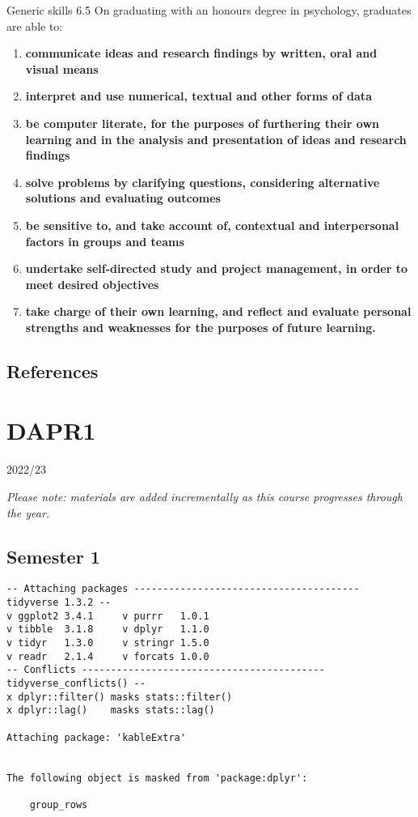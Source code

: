 \documentclass[
  11pt,
  letterpaper,
  oneside,
  open=any]{scrbook}
\begin{document}
Generic skills 6.5 On graduating with an honours degree in psychology,
graduates are able to:

\begin{enumerate}
\def\labelenumi{\arabic{enumi}.}
\item
  \textbf{communicate ideas and research findings by written, oral and
  visual means}
\item
  \textbf{interpret and use numerical, textual and other forms of data}
\item
  \textbf{be computer literate, for the purposes of furthering their own
  learning and in the analysis and presentation of ideas and research
  findings}
\item
  \textbf{solve problems by clarifying questions, considering
  alternative solutions and evaluating outcomes}
\item
  \textbf{be sensitive to, and take account of, contextual and
  interpersonal factors in groups and teams}
\item
  \textbf{undertake self-directed study and project management, in order
  to meet desired objectives}
\item
  \textbf{take charge of their own learning, and reflect and evaluate
  personal strengths and weaknesses for the purposes of future
  learning.}\\
\end{enumerate}

\hypertarget{references}{%
\section{References}\label{references}}


\hypertarget{dapr1}{%
\chapter{DAPR1}\label{dapr1}}

2022/23

\hfill\break

\emph{Please note: materials are added incrementally as this course
progresses through the year.}

\hypertarget{semester-1-1}{%
\section{Semester 1}\label{semester-1-1}}

\begin{verbatim}
-- Attaching packages --------------------------------------- tidyverse 1.3.2 --
v ggplot2 3.4.1     v purrr   1.0.1
v tibble  3.1.8     v dplyr   1.1.0
v tidyr   1.3.0     v stringr 1.5.0
v readr   2.1.4     v forcats 1.0.0
-- Conflicts ------------------------------------------ tidyverse_conflicts() --
x dplyr::filter() masks stats::filter()
x dplyr::lag()    masks stats::lag()

Attaching package: 'kableExtra'


The following object is masked from 'package:dplyr':

    group_rows
\end{verbatim}
\end{document}
